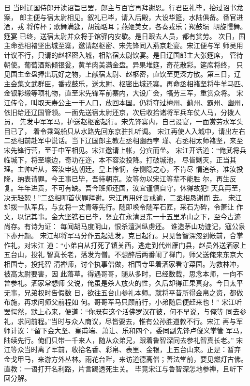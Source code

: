 日
当时辽国侍郎开读诏旨已罢，郎主与百官再拜谢恩。行君臣礼毕，抬过诏书龙案，
郎主便与宿太尉相见。叙礼已毕，请入后殿，大设华筵，水陆俱备。番官进酒，戎
将传杯；歌舞满筵，胡笳聒耳；燕姬美女，各奏戎乐；羯鼓埙，胡旋慢舞。筵宴
已终，送宿太尉并众将于馆驿内安歇。是日跟去人员，都有赏劳。
次日，国主命丞相褚坚出城至寨，邀请赵枢密、宋先锋同入燕京赴宴。宋江便与军
师吴用计议不行，只请的赵枢密入城，相陪宿太尉饮宴。是日辽国郎主大张筵席，
管待朝使。葡萄酒熟倾银瓮，黄羊肉美满金盘。异果堆筵，奇花散彩。筵席将终，
只见国主金盘捧出玩好之物，上献宿太尉、赵枢密，直饮至更深方散。第三日，辽
主会集文武群臣，番戎鼓乐，送太尉、枢密出城还寨。再命丞相褚坚将牛羊马匹、
金银彩缎等项礼物，直至宋先锋军前寨内，大设广会，犒劳三军，重赏众将。
宋江传令，叫取天寿公主一干人口，放回本国。仍将夺过檀州、蓟州、霸州、幽州，
依旧给还辽国管领。一面先送宿太尉还京，次后收拾诸将军兵车仗人马，分拨人员，
先发中军军马，护送赵枢密起行。宋先锋寨内，自己设宴，一面赏劳水军头目已了，
着令乘驾船只从水路先回东京驻扎听调。
宋江再使人入城中，请出左右二丞相前赴军中说话。当下辽国郎主教左丞相幽西孛
瑾、右丞相太师褚坚，来至宋先锋行营，至于中军相见。宋江邀请上帐，分宾而坐。
宋江开话道：“俺武将兵临城下，将至壕边，奇功在迩，本不容汝投降。打破城池，
尽皆剿灭，正当其理。主帅听从，容汝申达朝廷。皇上怜悯，存恻隐之心，不肯尽
情追杀，准汝投降，纳表请罪。今王事已毕，吾待朝京。汝等勿以宋江等辈不能胜
尔，再生反复。年年进贡，不可有缺。吾今班师还国，汝宜谨慎自守，休得故犯!
天兵再至，决无轻恕！”二丞相叩首伏罪拜谢。宋江再用好言戒谕，二丞相恳谢而
去。
宋江却拨一队军兵，与女将一丈青等先行。随即唤令随军石匠，采石为碑，令萧让
作文，以记其事。金大坚镌石已毕，竖立在永清县东一十五里茅山之下，至今古迹
尚存。有诗为证：
每闻胡马度阴山，恨杀澶渊纵虏还。
谁造茅山功迹记，寇公泉下亦开颜。
宋江却将军马分作五起进发，克日起行。只见鲁智深忽到帐前，合掌作礼，对宋江
道：“小弟自从打死了镇关西，逃走到代州雁门县，赵员外送洒家上五台山，投礼
智真长老，落发为僧。不想醉后两番闹了禅门，师父送俺来东京大相国寺，投托智
清禅师，讨个执事僧做，相国寺里着洒家看守菜园。为救林冲，被高太尉要害，因
此落草。得遇哥哥，随从多时，已经数载，思念本师，一向不曾参礼。洒家常想师
父说，俺虽是杀人放火的性，久后却得正果真身。今日太平无事，兄弟权时告假数
日，欲往五台山参礼本师。就将平昔所得金帛之资，都做布施，再求问师父前程如
何。哥哥军马只顾前行，小弟随后便赶来也！”
宋江听罢愕然，默上心来，便道：“你既有这个活佛罗汉在彼，何不早说，与俺等
同去参礼，求问前程。”当时与众人商议，尽皆要去，惟有公孙胜道教不行。宋江
再与军师计议：“留下金大坚、皇甫端、萧让、乐和四个，委同副先锋卢俊义掌管
军马，陆续先行。俺们只带一千来人，随从众弟兄，跟着鲁智深同去参礼智真长老。”
宋江等众当时离了军前，收拾名香、彩帛、表里、金银，上五台山来。正是：暂弃
金戈甲马，来游方外丛林。雨花台畔，来访道德高僧；善法堂前，要见燃灯古佛。
直教：一语打开名利路，片言踢透死生关。
毕竟宋江与鲁智深怎地参禅，且听下回分解。